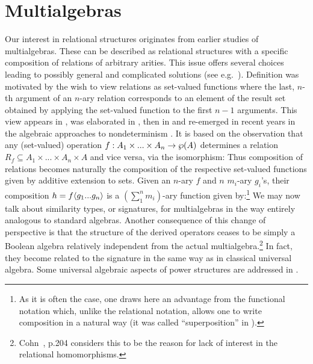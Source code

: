 \documentclass[10pt]{article}
\begin{document}
\section{Multialgebras}
\label{se:mult}
Our interest in relational structures originates from earlier studies
of multialgebras. These can be described as relational structures with
a specific composition
of relations of arbitrary arities. This issue offers several
choices leading to possibly general and complicated solutions (see
e.g.\ \cite{glenn,Topen:93}).  Definition  was motivated by
the wish to view relations as set-valued functions where the last,
$n$-th argument of an $n$-ary relation corresponds to an element of
the result set obtained by applying the set-valued function to the first $n-1$
arguments.  This view appears in \cite{c:101}, was elaborated in
\cite{JT1,JT2}, then in \cite{c:102} and re-emerged in recent years in
the algebraic approaches to nondeterminism
\cite{c:64,c:59,c:Bia1,c:130,survey}. 
It is based on the
observation that any (set-valued) operation
$f:A_1\times...\times A_n\rightarrow \wp(A)$ determines a relation
$R_f\subseteq A_1\times...\times A_n\times A$ and vice versa, via the
isomorphism: 
%
%
Thus composition of relations becomes
naturally the composition of the respective set-valued functions given
by additive extension to sets.
Given
an $n$-ary $f$ and $n$ $m_i$-ary $g_i$'s, their composition
$h=f\langle g_1...g_n\rangle$ is a $(\sum_1^n m_i)$-ary function given 
by:\footnote{As it is often the case, one draws here an advantage from
the functional notation which, unlike the relational notation, allows
one to write composition in a natural way (it was called
``superposition'' in \cite{JT1}).}
%
%
We may now talk about similarity types, or signatures, for
multialgebras in the way entirely analogous to standard algebras. 
Another consequence of this change of perspective is 
that the structure of the derived operators ceases to be simply
a Boolean algebra relatively independent from the actual
multialgebra.\footnote{Cohn~\cite{Cohn}, p.204 considers this to be the reason
for lack of interest in the relational homomorphisms.} In fact, they become related to the signature in the
same way as in classical universal algebra.
Some universal algebraic aspects of power structures 
are addressed in \cite{GW84,goldblatt89,brink93, adBrink93, brink97}.
\end{document}

